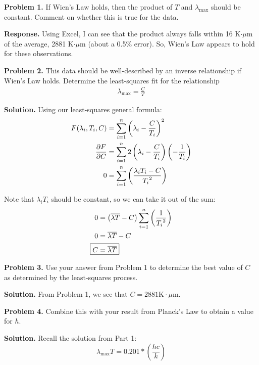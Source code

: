 \documentclass{article}
\begin{document}
\textbf{Problem 1.} If Wien's Law holds, then the product of $T$ and $\lambda_\text{max}$ should be constant. Comment on whether this is true for the data.

\textbf{Response.} Using Excel, I can see that the product always falls within 16 K$\cdot\mu$m of the average, 2881 K$\cdot\mu$m (about a 0.5\% error). So, Wien's Law appears to hold for these observations.

\textbf{Problem 2.} This data should be well-described by an inverse relationship if Wien's Law holds. Determine the least-squares fit for the relationship
\begin{equation*}
\begin{aligned}
\lambda_\text{max} = \frac{C}{T}
\end{aligned}
\end{equation*}

\textbf{Solution.} Using our least-squares general formula:
\begin{equation*}
\begin{aligned}
F(\lambda_i, T_i, C) &= \sum_{i=1}^n\left(\lambda_i-\frac{C}{T_i}\right)^2 \\
\pdv{F}{C} &= \sum_{i=1}^n 2\left(\lambda_i - \frac{C}{T_i}\right)\left(-\frac{1}{T_i}\right) \\
0 &= \sum_{i=1}^n\left(\frac{\lambda_i T_i - C}{{T_i}^2}\right)
\end{aligned}
\end{equation*}

Note that $\lambda_i T_i$ should be constant, so we can take it out of the sum:
\begin{equation*}
\begin{aligned}
0 &= \left(\overline{\lambda T} - C\right)\sum_{i=1}^n\left(\frac{1}{{T_i}^2}\right) \\
0 &= \overline{\lambda T} - C \\
\Aboxed{C &= \overline{\lambda T}}
\end{aligned}
\end{equation*}

\textbf{Problem 3.} Use your answer from Problem 1 to determine the best value of $C$ as determined by the least-squares process.

\textbf{Solution.} From Problem 1, we see that $\boxed{C = 2881 \text{K}\cdot\mu\text{m}}$.

\textbf{Problem 4.} Combine this with your result from Planck's Law to obtain a value for $h$.

\textbf{Solution.} Recall the solution from Part 1:
\begin{equation}
\lambda_\text{max} T = 0.201 *\left(\frac{hc}{k}\right)
\end{equation}
\end{document}
